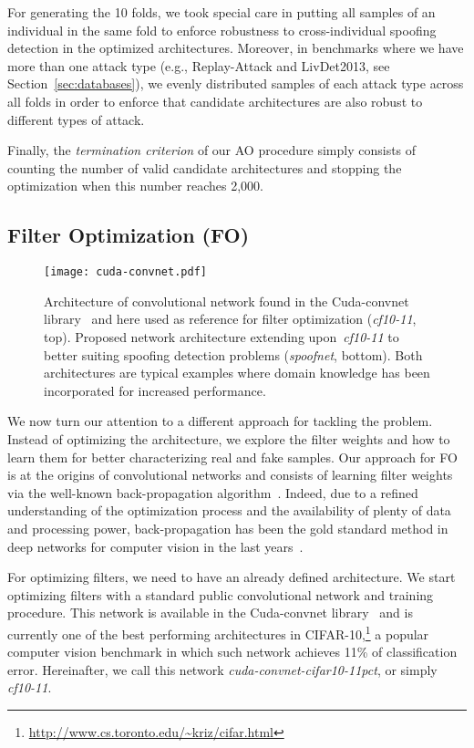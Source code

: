 For generating the 10 folds, we took special care in putting all samples of an individual in the same fold to enforce robustness to cross-individual spoofing detection in the optimized architectures.
Moreover, in benchmarks where we have more than one attack type (e.g., Replay-Attack and LivDet2013, see Section~\ref{sec:databases}), we evenly distributed samples of each attack type across all folds in order to enforce that candidate architectures are also robust to different types of attack.

Finally, the \emph{termination criterion} of our AO procedure simply consists of counting the number of valid candidate architectures and stopping the optimization when this number reaches 2,000.


\subsection{Filter Optimization (FO)}
\label{sec:fo}

\begin{figure}
\begin{center}
\texttt{[image: cuda-convnet.pdf]}
\caption{
Architecture of convolutional network found in the Cuda-convnet library~\cite{Krizhevsky:cuda-convnet:2012} and here used as reference for filter optimization (\emph{cf10-11}, top). Proposed network architecture extending upon~\emph{cf10-11} to better suiting spoofing detection problems (\emph{spoofnet}, bottom). Both architectures are typical examples where domain knowledge has been incorporated for increased performance.
}
\label{fig:cudaconvnet}
\end{center}
\end{figure}

We now turn our attention to a different approach for tackling the problem. Instead of optimizing the architecture, we explore the filter weights and how to learn them for better characterizing real and fake samples. Our approach for FO is at the origins of convolutional networks and consists of learning filter weights via the well-known back-propagation algorithm~\cite{LeCun:1998}. Indeed, due to a refined understanding of the optimization process and the availability of plenty of data and processing power, back-propagation has been the gold standard method in deep networks for computer vision in the last years~\cite{Krizhevsky:2012,Simonyan:2014,Zeiler:2014}.

For optimizing filters, we need to have an already defined architecture. We start optimizing filters with a standard public convolutional network and training procedure. This network is available in the Cuda-convnet library~\cite{Krizhevsky:cuda-convnet:2012} and is currently one of the best performing architectures in CIFAR-10,\footnote{\url{http://www.cs.toronto.edu/~kriz/cifar.html}} a popular computer vision benchmark in which such network achieves 11\% of classification error. Hereinafter, we call this network \emph{cuda-convnet-cifar10-11pct}, or simply \emph{cf10-11}.

